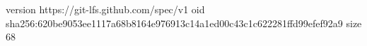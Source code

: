 version https://git-lfs.github.com/spec/v1
oid sha256:620be9053ee1117a68b8164e976913c14a1ed00c43c1c622281ffd99efef92a9
size 68
